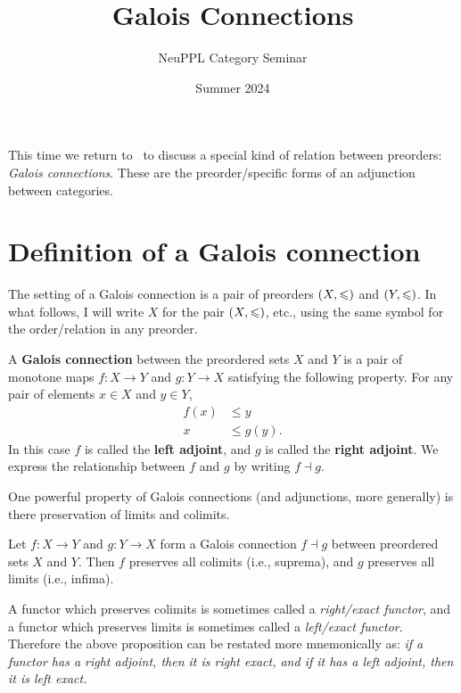 \documentclass{../thesis-note}
\title{Galois Connections}
\author{NeuPPL Category Seminar}
\date{Summer 2024}
\begin{document}
\maketitle%

This time we return to~\cite{Fong2019} to discuss a special kind of relation
between preorders: \emph{Galois connections}. These are the preorder\-/specific
forms of an adjunction between categories.

\section{Definition of a Galois connection}

The setting of a Galois connection is a pair of preorders \({\left(X,\leqslant\right)}\) and
\({\left(Y,\leqslant\right)}\). In what follows, I will write \(X\) for the pair
\({\left(X,\leqslant\right)}\), etc., using the same symbol for the order\-/relation in any
preorder.
\begin{definition}
  A \textbf{Galois connection} between the preordered sets \(X\) and \(Y\) is a
  pair of monotone maps \(f: X \to Y\) and \(g: Y \to X\) satisfying the
  following property. For any pair of elements \(x \in X\) and \(y \in Y\),
  \[%
    \begin{array}{rl}
      f(x) &\leq y \\\hline\hline
      x &\leq g(y).
    \end{array}
  \]%
  In this case \(f\) is called the \textbf{left adjoint}, and \(g\) is called
  the \textbf{right adjoint}. We express the relationship between \(f\) and
  \(g\) by writing \(f \dashv g\).
\end{definition}
One powerful property of Galois connections (and adjunctions, more generally) is
there preservation of limits and colimits.
\begin{proposition}\label{prop:adjoints-preserve-limits}
  Let \(f: X \to Y\) and \(g: Y \to X\) form a Galois connection \(f \dashv g\)
  between preordered sets \(X\) and \(Y\). Then \(f\) preserves all colimits (i.e.,
  suprema), and \(g\) preserves all limits (i.e., infima).
\end{proposition}
\begin{remark}
  A functor which preserves colimits is sometimes called a \emph{right\-/exact
    functor}, and a functor which preserves limits is sometimes called a
  \emph{left\-/exact functor}. Therefore the above proposition can be restated
  more mnemonically as: \emph{if a functor has a right adjoint, then it
    is right exact, and if it has a left adjoint, then it is left exact.} 
\end{remark}
\end{document}
